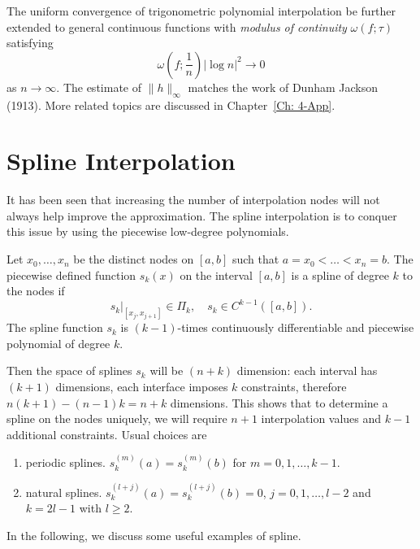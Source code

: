 \begin{remark}
    The uniform convergence of trigonometric polynomial interpolation be further extended to general continuous functions with \emph{modulus of continuity} $\omega(f;\tau)$ satisfying $$\omega(f;\frac{1}{n})|\log n|^2 \to 0$$ as $n\to\infty$. The estimate of $\|h\|_{\infty}$ matches the work of Dunham Jackson (1913). More related topics are discussed in Chapter~\ref{Ch: 4-App}.
\end{remark}

\section{Spline Interpolation}
\label{Sec: 2-Spl-Int}
It has been seen that increasing the number of interpolation nodes will not always help improve the approximation. The spline interpolation is to conquer this issue by using the piecewise low-degree polynomials. 

\begin{definition}
    Let $x_0, \dots, x_n$ be the distinct nodes on $[a, b]$ such that $a = x_0 <\dots < x_n = b$. The piecewise defined function $s_k(x)$ on the interval $[a, b]$ is a spline of degree $k$ to the nodes if  
    \begin{equation}
        s_k|_{[x_j, x_{j+1}]} \in \Pi_k, \quad s_k\in C^{k-1}([a, b]).
    \end{equation}
    The spline function $s_k$ is $(k-1)$-times continuously differentiable and piecewise polynomial of degree $k$.
\end{definition}
Then the space of splines $s_k$ will be $(n + k)$ dimension: each interval has $(k+1)$ dimensions, each interface imposes $k$ constraints, therefore $n (k+ 1) - (n-1) k = n + k$ dimensions. This shows that to determine a spline on the nodes uniquely, we will require $n+1$ interpolation values and $k-1$ additional constraints. Usual choices are
\begin{enumerate}
    \item periodic splines. $s_k^{(m)}(a) = s_k^{(m)}(b)$ for $m = 0, 1, \dots, k-1$.
    \item natural splines. $s_k^{(l+j)}(a) = s_k^{(l+j)}(b) = 0$, $j = 0, 1,\dots, l-2$ and $k = 2l-1$ with $l\ge 2$.
\end{enumerate}
In the following, we discuss some useful examples of spline. 
